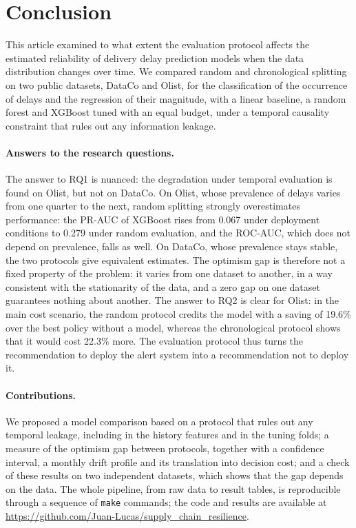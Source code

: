 \documentclass[11pt,a4paper]{article}
\theoremstyle{definition}
\begin{document}
\section{Conclusion}
\label{sec:conclusion}

This article examined to what extent the evaluation protocol affects the estimated reliability of delivery delay prediction models when the data distribution changes over time. We compared random and chronological splitting on two public datasets, DataCo and Olist, for the classification of the occurrence of delays and the regression of their magnitude, with a linear baseline, a random forest and XGBoost tuned with an equal budget, under a temporal causality constraint that rules out any information leakage.

\paragraph{Answers to the research questions.} The answer to RQ1 is nuanced: the degradation under temporal evaluation is found on Olist, but not on DataCo. On Olist, whose prevalence of delays varies from one quarter to the next, random splitting strongly overestimates performance: the PR-AUC of XGBoost rises from 0.067 under deployment conditions to 0.279 under random evaluation, and the ROC-AUC, which does not depend on prevalence, falls as well. On DataCo, whose prevalence stays stable, the two protocols give equivalent estimates. The optimism gap is therefore not a fixed property of the problem: it varies from one dataset to another, in a way consistent with the stationarity of the data, and a zero gap on one dataset guarantees nothing about another. The answer to RQ2 is clear for Olist: in the main cost scenario, the random protocol credits the model with a saving of 19.6\% over the best policy without a model, whereas the chronological protocol shows that it would cost 22.3\% more. The evaluation protocol thus turns the recommendation to deploy the alert system into a recommendation not to deploy it.

\paragraph{Contributions.} We proposed a model comparison based on a protocol that rules out any temporal leakage, including in the history features and in the tuning folds; a measure of the optimism gap between protocols, together with a confidence interval, a monthly drift profile and its translation into decision cost; and a check of these results on two independent datasets, which shows that the gap depends on the data. The whole pipeline, from raw data to result tables, is reproducible through a sequence of \texttt{make} commands; the code and results are available at \url{https://github.com/Juan-Lucas/supply_chain_resilience}.
\end{document}
